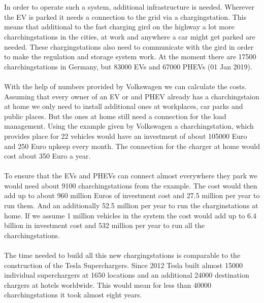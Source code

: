 \begin{parcolumns}[colwidths={1=2.5 cm, 2=10 cm, 3=2.5cm}]{3}
{\\ \\
\noindent
In order to operate such a system, additional infrastructure is needed. Wherever the EV is parked it needs a connection to the grid via a chargingstation. This means that additional to the fast charging gird on the highway a lot more charchingstations in the cities, at work and anywhere a car might get parked are needed. These chargingstations also need to communicate with the gird in order to make the regulation and storage system work.
At the moment there are 17500 charchingstations in Germany, but 83000 EVs and 67000 PHEVs (01 Jan 2019).
\\ \\
With the help of numbers provided by Volkswagen we can calculate the costs. Assuming that every owner of an EV or and PHEV already has a charchingstaion at home we only need to install additional ones at workplaces, car parks and public places. But the ones at home still need a connection for the load management. Using the example given by Volkswagen a charchingstation, which provides place for 22 vehicles would have an investment of about 105000 Euro and 250 Euro upkeep every month. The connection for the charger at home would cost about 350 Euro a year.
\\ \\
To ensure that the EVs and PHEVs can connect almost everywhere they park we would need about 9100 charchingstations from the example.
The cost would then add up to about 960 million Euros of investment cost and 27.5 million per year to run them. And an additionally 52.5 million per year to run the charginstations at home.
If we assume 1 million vehicles in the system the cost would add up to 6.4 billion in investment cost and 532 million per year to run all the charchingstations.
\\ \\
\noindent
The time needed to build all this new chargingstations is comparable to the construction of the Tesla Superchargers. Since 2012 Tesla built almost 15000 individual superchargers at 1650 locations and an additional 24000 destination chargers at hotels worldwide. This would mean for less than 40000 charchingstations it took almost eight years.
}
\end{parcolumns}
